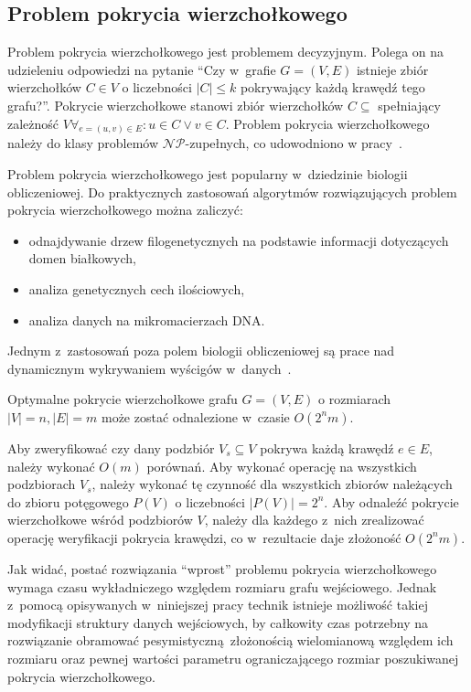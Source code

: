 \subsection{Problem pokrycia wierzchołkowego}\label{s_vertex_cover_domain}
\par{
  Problem pokrycia wierzchołkowego jest problemem decyzyjnym.
  Polega on na udzieleniu odpowiedzi na pytanie ``Czy w~grafie $G=(V,E)$
  istnieje zbiór wierzchołków $C \in V$ o liczebności $|C| \leq k$ pokrywający każdą krawędź tego grafu?''.
  Pokrycie wierzchołkowe stanowi zbiór wierzchołków $C \subseteq$ spełniający zależność $V\forall_{e=(u,v) \in E}:u\in C\lor v\in C$.
  Problem pokrycia wierzchołkowego należy do klasy problemów $\mathcal{NP}$-zupełnych, co udowodniono w pracy~\cite{Kar72}.
}
\par{
  Problem pokrycia wierzchołkowego jest popularny w~dziedzinie biologii obliczeniowej. 
  Do praktycznych zastosowań algorytmów rozwiązujących problem pokrycia wierzchołkowego można zaliczyć:
  \begin{itemize}
    \item odnajdywanie drzew filogenetycznych na podstawie informacji
      dotyczących domen białkowych,
    \item analiza genetycznych cech ilościowych,
    \item analiza danych na mikromacierzach DNA.\@
  \end{itemize}
  Jednym z~zastosowań poza polem biologii obliczeniowej są prace nad dynamicznym wykrywaniem wyścigów w~danych~\cite{O'Callahan:2003:HDD:781498.781528}.
}
\begin{theorem}
  Optymalne pokrycie wierzchołkowe grafu $G=(V,E)$ o rozmiarach $|V|=n, |E|=m$ może zostać odnalezione w~czasie $O(2^{n}m)$.
\end{theorem}
\begin{bproof}
  Aby zweryfikować czy dany podzbiór $V_s \subseteq V$ pokrywa każdą krawędź
  $e \in E$, należy wykonać $O(m)$ porównań.
  Aby wykonać operację na wszystkich podzbiorach $V_s$, należy wykonać tę
  czynność dla wszystkich zbiorów należących do zbioru potęgowego 
  $P(V)$ o liczebności $|P(V)| = 2^{n}$.
  Aby odnaleźć pokrycie wierzchołkowe wśród podzbiorów $V$, należy dla każdego z~nich zrealizować operację weryfikacji pokrycia krawędzi, co w~rezultacie daje 
  złożoność $O(2^{n}m)$.
\end{bproof}
\par{
  Jak widać, postać rozwiązania ``wprost'' problemu pokrycia wierzchołkowego wymaga czasu wykładniczego względem rozmiaru grafu wejściowego.
  Jednak z~pomocą opisywanych w~niniejszej pracy technik istnieje możliwość takiej modyfikacji struktury danych wejściowych, by całkowity czas potrzebny na rozwiązanie obramować pesymistyczną~złożonością wielomianową względem ich rozmiaru oraz pewnej wartości parametru ograniczającego rozmiar poszukiwanej pokrycia wierzchołkowego.
}
